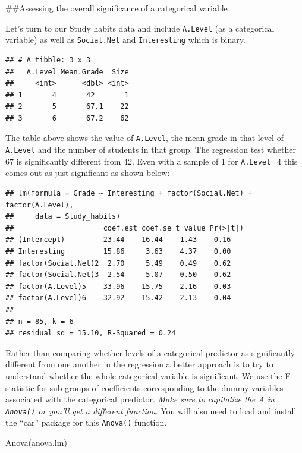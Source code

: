 \documentclass[
]{gitbook}
\newenvironment{Shaded}{\begin{snugshade}}{\end{snugshade}}
\newcommand{\FunctionTok}[1]{\textcolor[rgb]{0.00,0.00,0.00}{#1}}
\newcommand{\NormalTok}[1]{#1}
\begin{document}
\#\#Assessing the overall significance of a categorical variable

Let's turn to our Study habits data and include \texttt{A.Level} (as a categorical variable) as well as \texttt{Social.Net} and \texttt{Interesting} which is binary.

\begin{verbatim}
## # A tibble: 3 x 3
##   A.Level Mean.Grade  Size
##     <int>      <dbl> <int>
## 1       4       42       1
## 2       5       67.1    22
## 3       6       67.2    62
\end{verbatim}

The table above shows the value of \texttt{A.Level}, the mean grade in that level of \texttt{A.Level} and the number of students in that group. The regression test whether 67 is significantly different from 42. Even with a sample of 1 for \texttt{A.Level}=4 this comes out as just significant as shown below:

\begin{verbatim}
## lm(formula = Grade ~ Interesting + factor(Social.Net) + factor(A.Level), 
##     data = Study_habits)
##                     coef.est coef.se t value Pr(>|t|)
## (Intercept)         23.44    16.44    1.43    0.16   
## Interesting         15.86     3.63    4.37    0.00   
## factor(Social.Net)2  2.70     5.49    0.49    0.62   
## factor(Social.Net)3 -2.54     5.07   -0.50    0.62   
## factor(A.Level)5    33.96    15.75    2.16    0.03   
## factor(A.Level)6    32.92    15.42    2.13    0.04   
## ---
## n = 85, k = 6
## residual sd = 15.10, R-Squared = 0.24
\end{verbatim}

Rather than comparing whether levels of a categorical predictor as significantly different from one another in the regression a better approach is to try to understand whether the whole categorical variable is significant. We use the F-statistic for sub-groups of coefficients corresponding to the dummy variables associated with the categorical predictor. \emph{Make sure to \emph{capitalize} the A in \texttt{Anova()} or you'll get a different function}. You will also need to load and install the ``car'' package for this \texttt{Anova()} function.

\begin{Shaded}
\begin{Highlighting}[]
\FunctionTok{Anova}\NormalTok{(anova.lm)}
\end{Highlighting}
\end{Shaded}
\end{document}
